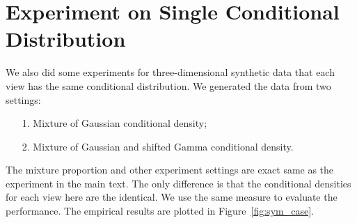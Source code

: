 \section{Experiment on Single Conditional Distribution}

We also did some experiments for three-dimensional synthetic data that each view has the same conditional distribution. We generated the data from two settings:
\begin{itemize}
\item[1.] Mixture of Gaussian conditional density;
\item[2.] Mixture of Gaussian and shifted Gamma conditional density.
\end{itemize}
The mixture proportion and other experiment settings are exact same as the experiment in the main text. The only difference is that the conditional densities for each view here are the identical. We use the same measure to evaluate the performance. The empirical results are plotted in Figure~\ref{fig:sym_case}.

